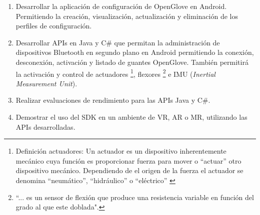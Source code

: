 \begin{enumerate}
\item Desarrollar la aplicación de configuración de OpenGlove en Android. Permitiendo la creación, visualización, actualización y eliminación de los perfiles de configuración.

\item Desarrollar APIs en Java y C\# que permitan la administración de dispositivos Bluetooth en segundo plano en Android permitiendo la conexión, desconexión, activación y listado de guantes OpenGlove.  También permitirá la activación y control de actuadores \footnote{Definición actuadores: Un actuador es un dispositivo inherentemente mecánico cuya función es proporcionar fuerza para mover o “actuar” otro dispositivo mecánico. Dependiendo de el origen de la fuerza el actuador se denomina ``neumático'', ``hidráulico'' o ``eléctrico'' \citep{actuadores}}, flexores \footnote{  ``... es un sensor de flexión que produce una resistencia variable en función del grado al que este doblada".\citep{flexor-sensor-01}} e IMU (\textit{Inertial Measurement Unit}).


\item Realizar evaluaciones de rendimiento para las APIs Java y C\#.

\item Demostrar el uso del SDK en un ambiente de VR, AR o MR, utilizando las APIs desarrolladas.
\end{enumerate}


